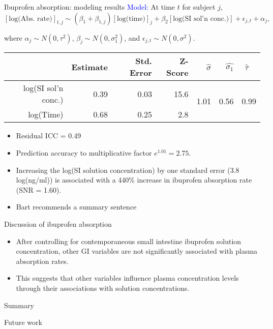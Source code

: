 \documentclass[handout]{beamer}
\begin{document}
\begin{frame}{Ibuprofen absorption: modeling results}
\small
\textcolor{blue}{Model:} At time $t$ for subject $j$, $$[\text{log(Abs. rate)}]_{t,j} \sim (\beta_1 + \beta_{1,j})[\text{log(time)}]_j + \beta_2[\text{log(SI sol'n conc.)}] + \epsilon_{j,t} + \alpha_j,$$

where $\alpha_j \sim N(0, \tau^2)$, $\beta_j \sim N(0, \sigma_1^2)$, and $\epsilon_{j,t} \sim N(0, \sigma^2)$.%
\footnotesize
\begin{table}[ht]
\centering
\begin{tabular}{rrrr||rrr}
  \hline
 & Estimate & Std. Error & Z-Score & $\hat{\sigma}$ & $\hat{\sigma_1}$ & $\hat{\tau}$ \ \\ 
  \hline
	log(SI sol'n conc.) & 0.39 & 0.03 & 15.6 & \multirow{2}{*}{1.01}& \multirow{2}{*}{0.56}& \multirow{2}{*}{0.99} \\ 
	log(Time) & 0.68 & 0.25 & 2.8 & & &\\ 
   \hline
\end{tabular}
\end{table}

\small
\begin{itemize}
	\item Residual ICC = 0.49
	\item Prediction accuracy to multiplicative factor $e^{1.01} = 2.75$.
	\item Increasing the log(SI solution concentration) by one standard error (3.8 log(ng/ml)) is associated with a 440\% increase in ibuprofen absorption rate (SNR = 1.60).
	\item Bart recommends a summary sentence
\end{itemize}

\end{frame}

\begin{frame}{Discussion of ibuprofen absorption}

\small

	\begin{itemize}
	\setlength\itemsep{1em}
		\item After controlling for contemporaneous small intestine ibuprofen solution concentration, other GI variables are not significantly associated with plasma absorption rates.

		\item This suggests that other variables influence plasma concentration levels through their associations with solution concentrations.

	\end{itemize}
\end{frame}


\begin{frame}{Summary}

\end{frame}

\begin{frame}{Future work}

\end{frame}
\end{document}
